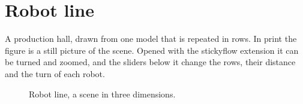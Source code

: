 \documentclass{article}
\begin{document}
\section*{Robot line}

A production hall, drawn from one model that is repeated in rows. In print the figure is a still picture of the scene. Opened with the
stickyflow extension it can be turned and zoomed, and the sliders below it change the rows, their distance and the turn of each robot.

\begin{figure}[h]
  \centering
  \caption{Robot line, a scene in three dimensions.}
\end{figure}
\end{document}
